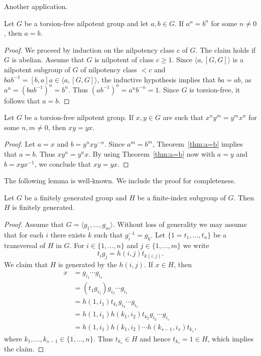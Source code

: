 Another application.

\begin{theorem}
	\label{thm:a=b}
	Let $G$ be a torsion-free nilpotent group and let $a,b\in G$. If $a^n=b^n$ for some 
	$n\ne 0$, then $a=b$.
\end{theorem}

\begin{proof}
	We proceed by induction on the nilpotency class $c$ of $G$. The claim holds if $G$ is abelian. Assume 
	that $G$ is nilpotent of class $c\geq1$. Since $\langle a,[G,G]\rangle$ is a nilpotent subgroup of
	$G$ of nilpotency class $<c$ and $bab^{-1}=[b,a]a\in \langle
	a,[G,G]\rangle$, the inductive hypothesis implies that $ba=ab$, as  
	$a^n=(bab^{-1})^n=b^n$. Thus $(ab^{-1})^n=a^nb^{-n}=1$. Since $G$ is torsion-free, it follows that $a=b$.
\end{proof}

\begin{corollary}
	Let $G$ be a torsion-free nilpotent group. If $x,y\in G$ are such that 
	$x^ny^m=y^mx^n$ for some $n,m\ne 0$, then $xy=yx$.
\end{corollary}

\begin{proof}
	Let $a=x$ and $b=y^nxy^{-n}$. Since $a^m=b^m$, Theorem~\ref{thm:a=b} implies that $a=b$. Thus $xy^n=y^nx$. 
	By using Theorem~\ref{thm:a=b} now with $a=y$ and $b=xyx^{-1}$, we conclude that 
	$xy=yx$. 
\end{proof}

The following lemma is well-known. We include the proof for completeness. 

\begin{lemma}
	\label{lem:fg}
	Let $G$ be a finitely generated group and $H$ be a finite-index subgroup of $G$. 
	Then $H$ is finitely generated. 
\end{lemma}

\begin{proof}
	Assume that $G=\langle g_1,\dots,g_m\rangle$. Without loss of generality we may assume that 
	for each $i$ there exists $k$ such that $g_i^{-1}=g_k$. 
	Let $\{1=t_1,\dots,t_n\}$ be a transversal of $H$ in $G$. For 
	$i\in\{1,\dots,n\}$ and 
	$j\in\{1,\dots,m\}$ we write 
	\[
		t_ig_j=h(i,j)t_{k(i,j)}.
	\]
	We claim that $H$ is generated by the $h(i,j)$. If $x\in H$, then 
	\begin{align*}
	x &=g_{i_1}\cdots g_{i_s}\\
	&= (t_1g_{i_1})g_{i_2}\cdots g_{i_s}\\
	&= h(1,i_1)t_{k_1}g_{i_2}\cdots g_{i_s}\\
	&= h(1,i_1)h(k_1,i_2)t_{k_2}g_{i_3}\cdots g_{i_s}\\
	&= h(1,i_1)h(k_1,i_2)\cdots h(k_{s-1},i_s)t_{k_s},
	\end{align*}
	where $k_1,\dots,k_{s-1}\in\{1,\dots,n\}$. Thus $t_{k_s}\in H$ and hence 
	$t_{k_s}=1\in H$, which implies the claim.  
\end{proof}

